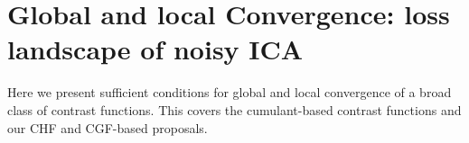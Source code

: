 \documentclass[letterpaper]{article}
\newcommand{\ba}[1]{\begin{align}#1\end{align}}
\newcommand{\bu}{\pmb{u}}
\newcommand{\bx}{\pmb{x}}
\newcommand{\br}{\pmb{r}}
\newcommand{\bv}{\pmb{v}}
\newcommand{\rd}{\color{red}}
\newcommand{\bk}{\color{black}}
\newcommand{\bb}[1]{\left(#1\right)}
\begin{document}

\section{Global and local Convergence: loss landscape of noisy ICA} \label{sec:convergence}
Here we present sufficient conditions for global and local convergence of a broad class of contrast functions. This covers the cumulant-based contrast functions and our CHF and CGF-based proposals. \bk

\end{document}
